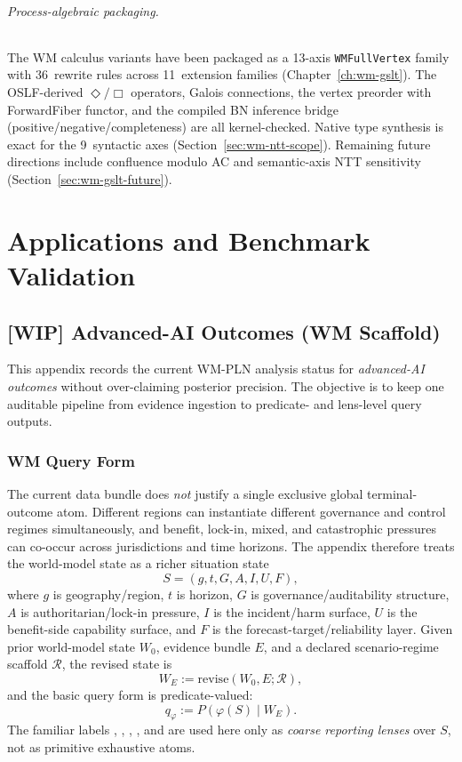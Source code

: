 \documentclass[11pt,openany]{report}
\begin{document}
\paragraph{Process-algebraic packaging.}
The WM calculus variants have been packaged as a 13-axis
\texttt{WMFullVertex} family with 36~rewrite rules across 11~extension
families (Chapter~\ref{ch:wm-gslt}).  The OSLF-derived $\Diamond/\Box$
operators, Galois connections, the vertex preorder with ForwardFiber
functor, and the compiled BN inference bridge (positive/negative/completeness)
are all kernel-checked.  Native type synthesis is exact for the 9~syntactic
axes (Section~\ref{sec:wm-ntt-scope}).  Remaining future directions
include confluence modulo AC and semantic-axis NTT sensitivity
(Section~\ref{sec:wm-gslt-future}).


\part{Applications and Benchmark Validation}
\label{part:applications}

\chapter{[WIP] Advanced-AI Outcomes (WM Scaffold)}
\label{app:ai-outcomes}

This appendix records the current WM-PLN analysis status for
\emph{advanced-AI outcomes} without over-claiming posterior precision.
The objective is to keep one auditable pipeline from evidence ingestion
to predicate- and lens-level query outputs.

\section{WM Query Form}

The current data bundle does \emph{not} justify a single exclusive
global terminal-outcome atom.  Different regions can instantiate
different governance and control regimes simultaneously, and benefit,
lock-in, mixed, and catastrophic pressures can co-occur across
jurisdictions and time horizons.  The appendix therefore treats the
world-model state as a richer situation state
\[
  S = (g, t, G, A, I, U, F),
\]
where $g$ is geography/region, $t$ is horizon, $G$ is
governance/auditability structure, $A$ is authoritarian/lock-in
pressure, $I$ is the incident/harm surface, $U$ is the benefit-side
capability surface, and $F$ is the forecast-target/reliability layer.
Given prior world-model state $W_0$, evidence bundle $E$, and a declared
scenario-regime scaffold $\mathcal{R}$, the revised state is
\[
  W_E := \mathrm{revise}(W_0, E; \mathcal{R}),
\]
and the basic query form is predicate-valued:
\[
  q_{\varphi} := P(\varphi(S) \mid W_E).
\]
The familiar labels
,
,
,
, and  are used here
only as \emph{coarse reporting lenses} over $S$, not as primitive
exhaustive atoms.
\end{document}
